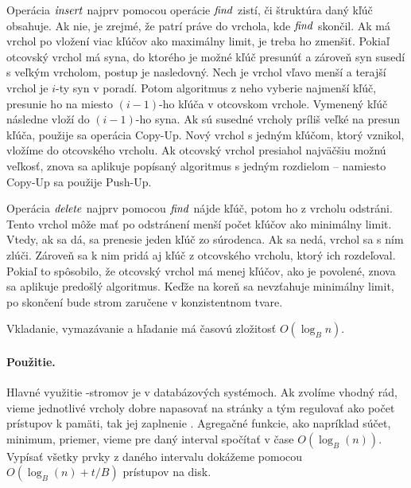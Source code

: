 Operácia $\mathop{\mathit{insert}}$ najprv pomocou operácie $\mathop{\mathit{find}}$ zistí, či štruktúra daný kľúč obsahuje.
Ak nie, je zrejmé, že patrí práve do vrchola, kde $\mathop{\mathit{find}}$ skončil. Ak má vrchol po vložení
viac kľúčov ako maximálny limit, je treba ho zmenšiť. Pokiaľ otcovský vrchol má syna,
do ktorého je možné kľúč presunúť a zároveň syn susedí s veľkým vrcholom, postup je nasledovný.
Nech je vrchol vľavo menší a terajší vrchol je $i$-ty syn v poradí. Potom algoritmus z neho
vyberie najmenší kľúč, presunie ho na miesto $(i-1)$-ho kľúča v otcovskom vrchole. Vymenený
kľúč následne vloží do $(i-1)$-ho syna. Ak sú susedné vrcholy príliš veľké na presun kľúča,
použije sa operácia {\sc Copy-Up}. Nový vrchol s jedným kľúčom, ktorý vznikol, vložíme do
otcovského vrcholu. Ak otcovský vrchol presiahol najväčšiu možnú veľkosť, znova sa aplikuje
popísaný algoritmus s jedným rozdielom -- namiesto {\sc Copy-Up} sa použije {\sc Push-Up}.

Operácia $\mathop{\mathit{delete}}$ najprv pomocou $\mathop{\mathit{find}}$ nájde kľúč, potom ho z vrcholu odstráni. Tento vrchol
môže mať po odstránení menší počet kľúčov ako minimálny limit. Vtedy, ak sa dá, sa prenesie
jeden kľúč zo súrodenca. Ak sa nedá, vrchol sa s ním zlúči. Zároveň sa k nim pridá aj kľúč
z otcovského vrcholu, ktorý ich rozdeľoval. Pokiaľ to spôsobilo, že otcovský vrchol má menej
kľúčov, ako je povolené, znova sa aplikuje predošlý algoritmus. Keďže na koreň sa nevzťahuje
minimálny limit, po skončení bude strom zaručene v konzistentnom tvare.

Vkladanie, vymazávanie a hľadanie má časovú zložitosť $O(\log_B n)$.

\paragraph{Použitie.}
Hlavné využitie \Bp-stromov je v databázových systémoch. Ak zvolíme vhodný rád, vieme jednotlivé
vrcholy dobre napasovať na stránky a tým regulovať ako počet prístupov k pamäti, tak jej zaplnenie
\citet{sahni}. Agregačné funkcie, ako napríklad súčet, minimum, priemer, vieme pre daný interval
spočítať v čase $O(\log_B(n))$. Vypísať všetky prvky z daného intervalu dokážeme pomocou
$O(\log_B(n) + t/B)$ prístupov na disk.

